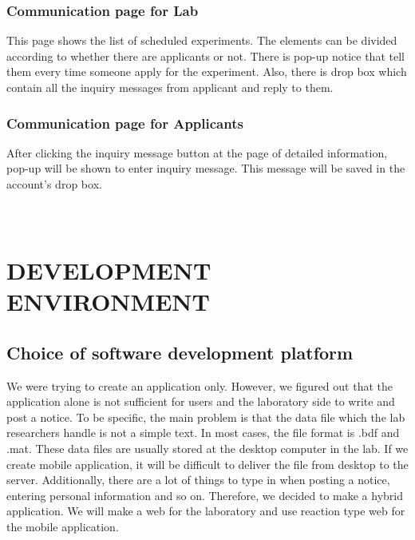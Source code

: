 \documentclass[letterpaper, 10 pt, conference]{ieeeconf}  %
\begin{document}
\subsubsection{Communication page for Lab}
This page shows the list of scheduled experiments. The elements can be divided according to whether there are applicants or not. There is pop-up notice that tell them every time someone apply for the experiment. Also, there is drop box which contain all the inquiry messages from applicant and reply to them. 
\subsubsection{Communication page for Applicants}
After clicking the inquiry message button at the page of detailed information, pop-up will be shown to enter inquiry message. This message will be saved in the account's drop box. 


\section{\\DEVELOPMENT ENVIRONMENT}
\subsection{Choice of software development platform}


We were trying to create an application only. However, we figured out that the application alone is not sufficient for users and the laboratory side to write and post a notice. To be specific, the main problem is that the data file which the lab researchers handle is not a simple text. In most cases, the file format is .bdf and .mat. These data files are usually stored at the desktop computer in the lab. If we create mobile application, it will be difficult to deliver the file from desktop to the server. Additionally, there are a lot of things to type in when posting a notice, entering personal information and so on. Therefore, we decided to make a hybrid application. We will make a web for the laboratory and use reaction type web for the mobile application. 

\end{document}
